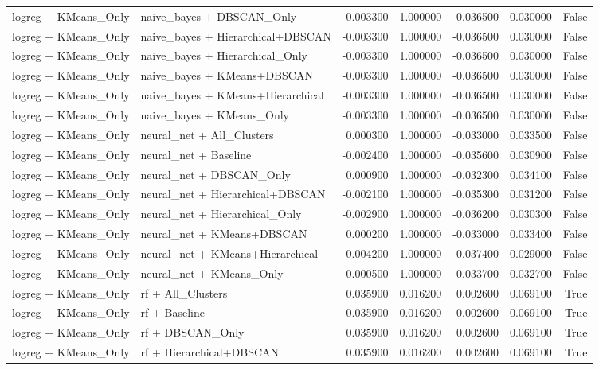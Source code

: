 \begin{tabular}{llrrrrr}
logreg + KMeans_Only & naive_bayes + DBSCAN_Only & -0.003300 & 1.000000 & -0.036500 & 0.030000 & False \\
logreg + KMeans_Only & naive_bayes + Hierarchical+DBSCAN & -0.003300 & 1.000000 & -0.036500 & 0.030000 & False \\
logreg + KMeans_Only & naive_bayes + Hierarchical_Only & -0.003300 & 1.000000 & -0.036500 & 0.030000 & False \\
logreg + KMeans_Only & naive_bayes + KMeans+DBSCAN & -0.003300 & 1.000000 & -0.036500 & 0.030000 & False \\
logreg + KMeans_Only & naive_bayes + KMeans+Hierarchical & -0.003300 & 1.000000 & -0.036500 & 0.030000 & False \\
logreg + KMeans_Only & naive_bayes + KMeans_Only & -0.003300 & 1.000000 & -0.036500 & 0.030000 & False \\
logreg + KMeans_Only & neural_net + All_Clusters & 0.000300 & 1.000000 & -0.033000 & 0.033500 & False \\
logreg + KMeans_Only & neural_net + Baseline & -0.002400 & 1.000000 & -0.035600 & 0.030900 & False \\
logreg + KMeans_Only & neural_net + DBSCAN_Only & 0.000900 & 1.000000 & -0.032300 & 0.034100 & False \\
logreg + KMeans_Only & neural_net + Hierarchical+DBSCAN & -0.002100 & 1.000000 & -0.035300 & 0.031200 & False \\
logreg + KMeans_Only & neural_net + Hierarchical_Only & -0.002900 & 1.000000 & -0.036200 & 0.030300 & False \\
logreg + KMeans_Only & neural_net + KMeans+DBSCAN & 0.000200 & 1.000000 & -0.033000 & 0.033400 & False \\
logreg + KMeans_Only & neural_net + KMeans+Hierarchical & -0.004200 & 1.000000 & -0.037400 & 0.029000 & False \\
logreg + KMeans_Only & neural_net + KMeans_Only & -0.000500 & 1.000000 & -0.033700 & 0.032700 & False \\
logreg + KMeans_Only & rf + All_Clusters & 0.035900 & 0.016200 & 0.002600 & 0.069100 & True \\
logreg + KMeans_Only & rf + Baseline & 0.035900 & 0.016200 & 0.002600 & 0.069100 & True \\
logreg + KMeans_Only & rf + DBSCAN_Only & 0.035900 & 0.016200 & 0.002600 & 0.069100 & True \\
logreg + KMeans_Only & rf + Hierarchical+DBSCAN & 0.035900 & 0.016200 & 0.002600 & 0.069100 & True \\

\end{tabular}
